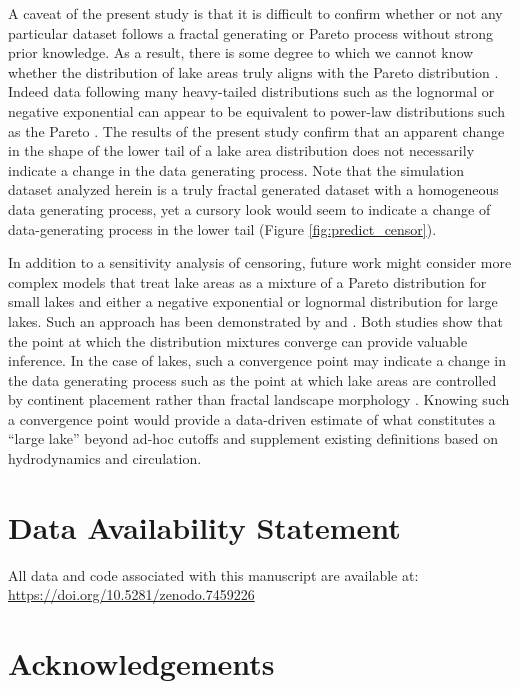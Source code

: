 \documentclass{article}
\begin{document}
A caveat of the present study is that it is difficult to confirm whether or not any particular dataset follows a fractal generating or Pareto process without strong prior knowledge. As a result, there is some degree to which we cannot know whether the distribution of lake areas truly aligns with the Pareto distribution \citep{seekell2011does}. Indeed data following many heavy-tailed distributions such as the lognormal or negative exponential can appear to be equivalent to power-law distributions such as the Pareto \citep{clausetPowerlawDistributionsEmpirical2009,seekell2011does}. The results of the present study confirm that an apparent change in the shape of the lower tail of a lake area distribution does not necessarily indicate a change in the data generating process. Note that the simulation dataset analyzed herein is a truly fractal generated dataset with a homogeneous data generating process, yet a cursory look would seem to indicate a change of data-generating process in the lower tail (Figure \ref{fig:predict_censor}).

In addition to a sensitivity analysis of censoring, future work might consider more complex models that treat lake areas as a mixture of a Pareto distribution for small lakes and either a negative exponential or lognormal distribution for large lakes. Such an approach has been demonstrated by \citep{bonabeau_scaling_1999-1} and \citep{scollnikCompositeLognormalParetoModels2007}. Both studies show that the point at which the distribution mixtures converge can provide valuable inference. In the case of lakes, such a convergence point may indicate a change in the data generating process such as the point at which lake areas are controlled by continent placement rather than fractal landscape morphology \citep{goodchildLakesFractalSurfaces1988,hamiltonEstimationFractalDimension1992}. Knowing such a convergence point would provide a data-driven estimate of what constitutes a “large lake” beyond ad-hoc cutoffs and supplement existing definitions based on hydrodynamics and circulation.

\section{Data Availability Statement}

All data and code associated with this manuscript are available at: \href{https://doi.org/10.5281/zenodo.7459226}{https://doi.org/10.5281/zenodo.7459226}

\section{Acknowledgements}
\end{document}
